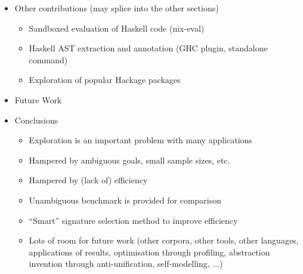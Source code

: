 \documentclass{article}
\begin{document}
\begin{itemize}
\item Other contributions (may splice into the other sections)
  \begin{itemize}
    \item Sandboxed evaluation of Haskell code (nix-eval)
    \item Haskell AST extraction and annotation (GHC plugin, standalone command)
    \item Exploration of popular Hackage packages
  \end{itemize}

\item Future Work

\item Conclusions
  \begin{itemize}
  \item Exploration is an important problem with many applications
  \item Hampered by ambiguous goals, small sample sizes, etc.
  \item Hampered by (lack of) efficiency
  \item Unambiguous benchmark is provided for comparison
  \item ``Smart'' signature selection method to improve efficiency
  \item Lots of room for future work (other corpora, other tools, other
    languages, applications of results, optimisation through profiling,
    abstraction invention through anti-unification, self-modelling, ...)
  \end{itemize}
\end{itemize}
\end{document}
